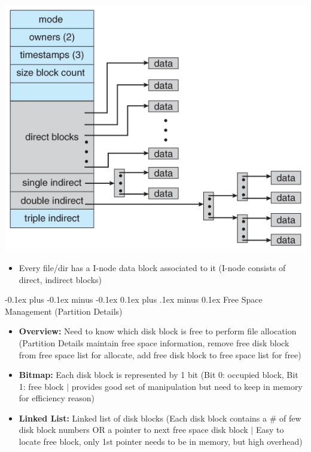 \documentclass[landscape]{article}
\makeatletter
\renewcommand{\subsection}{\@startsection{subsection}{2}{0mm}%
  {-0.1ex plus -0.1ex minus -0.1ex}%
  {0.1ex plus .1ex minus 0.1ex}%
{\normalfont\scriptsize\bfseries}}
\makeatother
\begin{document}
\begin{multicols*}{6}
\begin{enumerate}
\begin{itemize}
        \includegraphics[width=0.8\linewidth]{22_unix_inode.jpeg}
        \begin{itemize}
          \item Every file/dir has a I-node data block associated to it (I-node consists of direct, indirect blocks)
        \end{itemize}
      \end{itemize}
    \end{enumerate}

    \subsection{Free Space Management (Partition Details)}
    \begin{itemize}
      \item \textbf{Overview:} Need to know which disk block is free to perform file allocation (Partition Details maintain free space information, remove free disk block from free space list for allocate, add free disk block to free space list for free)
      \item \textbf{Bitmap:} Each disk block is represented by 1 bit (Bit 0: occupied block, Bit 1: free block $\vert$ provides good set of manipulation but need to keep in memory for efficiency reason)
      \item \textbf{Linked List:} Linked list of disk blocks (Each disk block contains a \# of few disk block numbers OR a pointer to next free space disk block $\vert$ Easy to locate free block, only 1st pointer needs to be in memory, but high overhead)
    \end{itemize}


\end{multicols*}
\end{document}
